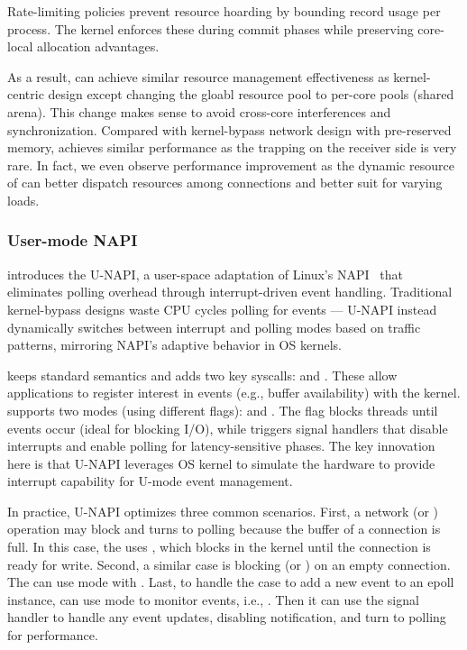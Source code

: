 Rate-limiting policies prevent resource hoarding by bounding record usage per process.
The kernel enforces these during commit phases while preserving core-local allocation advantages.

As a result, \gsocket can achieve similar resource management effectiveness as kernel-centric design except changing the gloabl resource pool to per-core pools (shared arena).
This change makes sense to avoid cross-core interferences and synchronization.
Compared with kernel-bypass network design with pre-reserved memory, \gsocket achieves similar performance as the trapping on the receiver side is very rare.
In fact, we even observe performance improvement as the dynamic resource of \gsocket can better dispatch resources among connections and better suit for varying loads.




\subsubsection{User-mode NAPI}
\label{ss:unapi}

\gsocket introduces the U-NAPI, a user-space adaptation of Linux's NAPI~\cite{linux-napi} that eliminates polling overhead through interrupt-driven event handling.
Traditional kernel-bypass designs waste CPU cycles polling for events --- U-NAPI instead dynamically switches between interrupt and polling modes based on traffic patterns, mirroring NAPI's adaptive behavior in OS kernels.

\gsocket keeps standard  semantics and adds two key syscalls:  and . 
These allow applications to register interest in events (e.g., buffer availability) with the kernel.
 supports two modes (using different flags):  and .
The  flag blocks threads until events occur (ideal for blocking I/O), while  triggers signal handlers that disable interrupts and enable polling for latency-sensitive phases.
The key innovation here is that U-NAPI leverages OS kernel to simulate the hardware to provide interrupt capability for U-mode event management.

In practice, U-NAPI optimizes three common scenarios.
First, a network  (or ) operation may block and turns to polling because the buffer of a connection is full.
In this case, the \gsocket uses ,
which blocks in the kernel until the connection is ready for write.
Second, a similar case is blocking  (or ) on an empty connection.
The \gsocket can use  mode with .
Last, to handle the case to add a new event to an epoll instance,
\gsocket can use  mode to monitor events, i.e., .
Then it can use the signal handler to handle any event updates, disabling notification, and turn to polling for performance.

